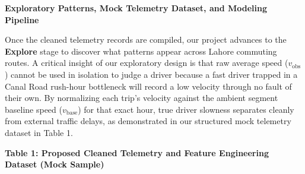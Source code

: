 \documentclass[12pt, a4paper]{article}
\newcommand{\subheading}[1]{%
  \vspace{8pt}%
  {\noindent\fontsize{14pt}{18pt}\selectfont\bfseries\color{slate}#1\par}%
  \vspace{4pt}%
}
\newcommand{\subsubheading}[1]{%
  \vspace{6pt}%
  {\noindent\fontsize{12pt}{15pt}\selectfont\bfseries\color{navyblue}#1\par}%
  \vspace{2pt}%
}
\begin{document}
\newpage


\subheading{Exploratory Patterns, Mock Telemetry Dataset, and Modeling Pipeline}

Once the cleaned telemetry records are compiled, our project advances to the \textbf{Explore} stage to discover what patterns appear across Lahore commuting routes. A critical insight of our exploratory design is that raw average speed ($v_{\text{obs}}$) cannot be used in isolation to judge a driver because a fast driver trapped in a Canal Road rush-hour bottleneck will record a low velocity through no fault of their own. By normalizing each trip's velocity against the ambient segment baseline speed ($v_{\text{base}}$) for that exact hour, true driver slowness separates cleanly from external traffic delays, as demonstrated in our structured mock telemetry dataset in Table 1.

\subsubheading{Table 1: Proposed Cleaned Telemetry and Feature Engineering Dataset (Mock Sample)}
\end{document}
